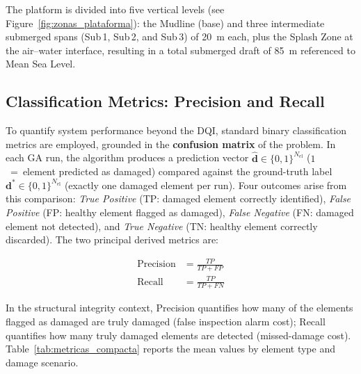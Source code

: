 \documentclass[preprint,12pt]{elsarticle}
\begin{document}
The platform is divided into five vertical levels (see Figure~\ref{fig:zonas_plataforma}): the Mudline (base) and three intermediate submerged spans (Sub\,1, Sub\,2, and Sub\,3) of 20~m each, plus the Splash Zone at the air--water interface, resulting in a total submerged draft of 85~m referenced to Mean Sea Level.

\subsection{Classification Metrics: Precision and Recall}
\label{subsec:metricas_clasificacion}

To quantify system performance beyond the DQI, standard binary classification metrics are
employed, grounded in the \textbf{confusion matrix} of the problem.
In each GA run, the algorithm produces a prediction vector
$\hat{\mathbf{d}} \in \{0,1\}^{N_\text{el}}$ ($1$~=~element predicted as damaged)
compared against the ground-truth label $\mathbf{d}^* \in \{0,1\}^{N_\text{el}}$
(exactly one damaged element per run). Four outcomes arise from this comparison:
\textit{True Positive} (TP: damaged element correctly identified),
\textit{False Positive} (FP: healthy element flagged as damaged),
\textit{False Negative} (FN: damaged element not detected), and
\textit{True Negative} (TN: healthy element correctly discarded).
The two principal derived metrics are:

\begin{align}
    \text{Precision} &= \frac{TP}{TP + FP} \label{eq:precision} \\[4pt]
    \text{Recall}    &= \frac{TP}{TP + FN} \label{eq:recall}
\end{align}

\noindent In the structural integrity context, Precision quantifies how many of the elements flagged as damaged are truly damaged (false inspection alarm cost); Recall quantifies how many truly damaged elements are detected (missed-damage cost).
Table~\ref{tab:metricas_compacta} reports the mean values by element type and damage scenario.

\end{document}
